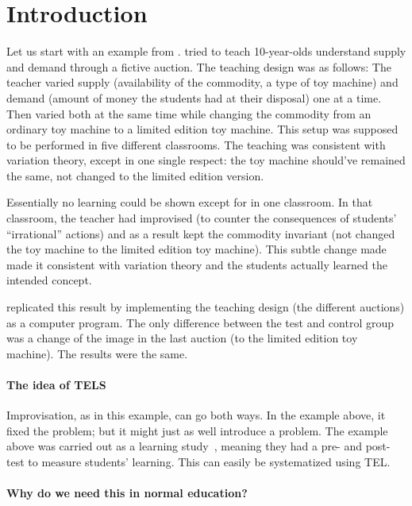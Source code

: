 \mode*

\section{Introduction}

Let us start with an example from \textcite[Ch.~7, 
p.~239]{NecessaryConditionsOfLearning}.
\Textcite{Auction10yo} tried to teach 10-year-olds understand supply and demand 
through a fictive auction.
The teaching design was as follows:
The teacher varied supply (availability of the commodity, a type of toy 
machine) and demand (amount of money the students had at their disposal) one at 
a time.
Then varied both at the same time while changing the commodity from an ordinary 
toy machine to a limited edition toy machine.
This setup was supposed to be performed in five different classrooms.
The teaching was consistent with variation theory, except in one single 
respect:
the toy machine should've remained the same, not changed to the limited edition 
version.

Essentially no learning could be shown except for in one classroom.
In that classroom, the teacher had improvised (to counter the consequences of 
students' \enquote{irrational} actions) and as a result kept the commodity 
invariant (not changed the toy machine to the limited edition toy machine).
This subtle change made made it consistent with variation theory and the 
students actually learned the intended concept.

\Textcite{AuctionReplication} replicated this result by implementing the 
teaching design (the different auctions) as a computer program.
The only difference between the test and control group was a change of the 
image in the last auction (to the limited edition toy machine).
The results were the same.

\paragraph{The idea of \acs*{TELS}}

Improvisation, as in this example, can go both ways.
In the example above, it fixed the problem; but it might just as well introduce 
a problem.
The example above was carried out as a learning study~\cite{LearningStudy}, 
meaning they had a pre- and post-test to measure students' learning.
This can easily be systematized using \ac{TEL}.

\paragraph{Why do we need this in normal education?}

